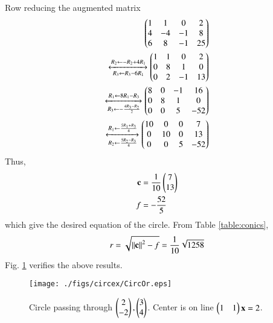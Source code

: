 \begin{enumerate}[label=\thesubsection.\arabic*.,ref=\thesubsection.\theenumi]
\begin{align}
\end{align}
Row reducing the augmented matrix
\begin{align}
\begin{pmatrix}
1 & 1 & 0 & 2
\\
4 & -4 & -1 & 8
\\ 
6 & 8 & -1  & 25
\end{pmatrix}
\\
\xleftrightarrow[R_3 \leftarrow R_3 -6R_1]{R_2 \leftarrow -R_2+4R_1}
\begin{pmatrix}
1 & 1 & 0 & 2
\\
0 & 8 & 1 & 0
\\ 
0 & 2 & -1  & 13
\end{pmatrix}
\\
\xleftrightarrow[R_3 \leftarrow -\frac{4R_3 -R_2}{2}]{R_1 \leftarrow 8R_1-R_3}
\begin{pmatrix}
8 & 0 & -1 & 16
\\
0 & 8 & 1 & 0
\\ 
0 & 0 & 5  & -52
\end{pmatrix}
\\
\xleftrightarrow[R_2 \leftarrow \frac{5R_2 -R_3}{4}]{R_1 \leftarrow \frac{5R_1+R_3}{4}}
\begin{pmatrix}
10 & 0 & 0 & 7
\\
0 & 10 & 0 & 13
\\ 
0 & 0 & 5  & -52
\end{pmatrix}
\end{align}
Thus, 
\begin{align}
\mathbf{c} &= \frac{1}{10}\begin{pmatrix}7\\13\end{pmatrix}
\\
f &=-\frac{52}{5}
\end{align}
which give the desired equation of the circle.
From Table \ref{table:conics},
%
\begin{align}
 r =  \sqrt{\left\lVert\mathbf{c}\right\rVert^2-f} = \frac{1}{10}\sqrt{1258}
\end{align}
Fig. \ref{fig:CircOr}	verifies the above results.

\begin{figure}[!ht]
\centering
\texttt{[image: ./figs/circex/CircOr.eps]}
\caption{Circle passing through $\begin{pmatrix}2\\-2\end{pmatrix},\begin{pmatrix}3\\4\end{pmatrix}$. Center is on line $\begin{pmatrix}1 & 1\end{pmatrix}\mathbf{x}=2$. }
\label{fig:CircOr}	
\end{figure}


\end{enumerate}
